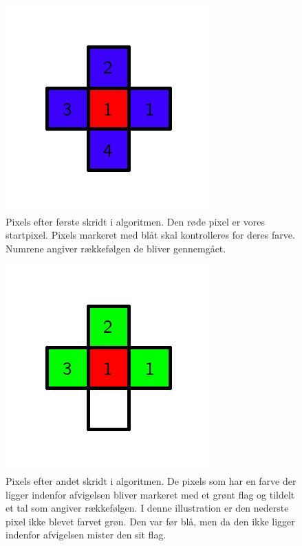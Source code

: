 {\begin{figure}[!h]
    \begin{center}
        \includegraphics[scale=0.42,angle=0]{afsnit/vores_implementation/billeder/flood_fill/floodfill2}
    \end{center}
    \caption[]{Pixels efter første skridt i algoritmen. Den røde pixel
    er vores startpixel. Pixels markeret med blåt skal kontrolleres for
    deres farve. Numrene angiver rækkefølgen de bliver gennemgået.}
    \label{floodfill2}
\end{figure}

\begin{figure}[!h]
    \begin{center}
        \includegraphics[scale=0.42,angle=0]{afsnit/vores_implementation/billeder/flood_fill/floodfill3}
    \end{center}
    \caption[]{Pixels efter andet skridt i algoritmen. De pixels som har
    en farve der ligger indenfor afvigelsen bliver markeret med et grønt
    flag og tildelt et tal som angiver rækkefølgen. I denne illustration
    er den nederste pixel ikke blevet farvet grøn. Den var før blå, men
    da den ikke ligger indenfor afvigelsen mister den sit flag.}
    \label{floodfill3}
\end{figure}

}
